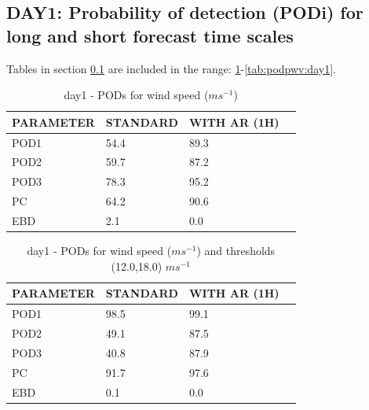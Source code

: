 \subsection{DAY1: Probability of detection (PODi) for long and short forecast time scales}\label{subsec:day1:pod}
Tables in section \ref{subsec:day1:pod} are included in the range: \ref{tab:podws:day1}-\ref{tab:podpwv:day1}.
\begin{table}[h!]
\begin{center}
\begin{tabular}{|l|l|l|l|}
\hline
\multicolumn{1}{|c|}{\cellcolor[HTML]{C0C0C0}\textbf{PARAMETER}} & \multicolumn{1}{c|}{\cellcolor[HTML]{C0C0C0}\textbf{STANDARD}} & \multicolumn{1}{c|}{\cellcolor[HTML]{C0C0C0}\textbf{WITH AR (1H)}} \\
\hline
\cellcolor[HTML]{C0C0C0}POD1  & 54.4                                & 89.3         \\
\cellcolor[HTML]{C0C0C0}POD2  & 59.7                                & 87.2         \\
\cellcolor[HTML]{C0C0C0}POD3  & 78.3                                & 95.2         \\
\cellcolor[HTML]{C0C0C0}PC    & 64.2                                  & 90.6           \\
\cellcolor[HTML]{C0C0C0}EBD   & 2.1                                 & 0.0          \\
\hline
\end{tabular}
\caption{day1 - PODs for wind speed ($m s^{-1}$)}
\label{tab:podws:day1}
\end{center}
\end{table}
\begin{table}[h!]
\begin{center}
\begin{tabular}{|l|l|l|l|}
\hline
\multicolumn{1}{|c|}{\cellcolor[HTML]{C0C0C0}\textbf{PARAMETER}} & \multicolumn{1}{c|}{\cellcolor[HTML]{C0C0C0}\textbf{STANDARD}} & \multicolumn{1}{c|}{\cellcolor[HTML]{C0C0C0}\textbf{WITH AR (1H)}} \\
\hline
\cellcolor[HTML]{C0C0C0}POD1  & 98.5   & 99.1         \\
\cellcolor[HTML]{C0C0C0}POD2  & 49.1   & 87.5         \\
\cellcolor[HTML]{C0C0C0}POD3  & 40.8   & 87.9         \\
\cellcolor[HTML]{C0C0C0}PC    & 91.7     & 97.6           \\
\cellcolor[HTML]{C0C0C0}EBD   & 0.1    & 0.0          \\
\hline
\end{tabular}
\caption{day1 - PODs for wind speed ($m s^{-1}$) and thresholds (12.0,18.0) $m s^{-1}$}
\label{tab:podwsFT:day1}
\end{center}
\end{table}
